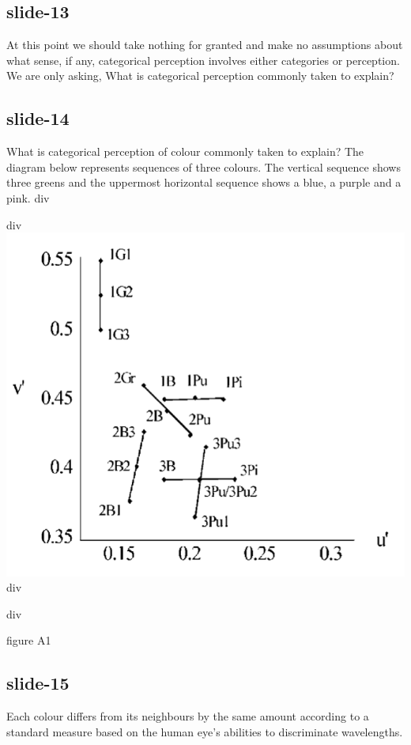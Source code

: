 \documentclass[12pt,\papersize]{extarticle}
\begin{document}
\subsection{slide-13}
At this point we should take nothing for granted and make no assumptions about what
sense, if any, categorical perception involves either categories or perception.
We  are only asking, What is categorical perception commonly taken to explain?

\subsection{slide-14}
What is categorical perception of colour commonly taken to explain?
The diagram below represents sequences of three colours.
The vertical sequence shows three greens and the uppermost horizontal sequence shows a
blue, a purple and a pink.
div \begin{center}
div \includegraphics[scale=0.3]{daoutis_2006_fig_A1.png}
div \end{center}
div \begin{center} \citealp{Daoutis:2006ij} figure A1 \end{center}

\subsection{slide-15}
Each colour differs from its neighbours by the same amount according to a standard
measure based on the human eye's abilities to discriminate wavelengths.
\end{document}

